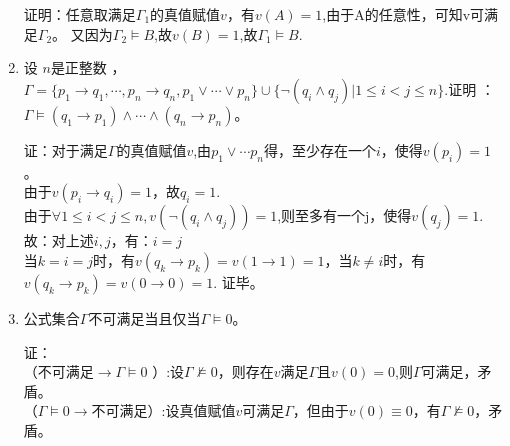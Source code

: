 \documentclass[UTF8]{ctexart}
\begin{document}
\begin{enumerate}
        证明：任意取满足$\Gamma_1$的真值赋值$v$，有$v(A)=1$,由于A的任意性，可知v可满足$\Gamma_2$。
        又因为$\Gamma_2\models B$,故$v(B)=1$,故$\Gamma_1\models B$.

        \item 设 $n$是正整数 ，$\Gamma =\{p_1\rightarrow q_1,\cdots,p_n\rightarrow q_n,p_1\vee \cdots \vee p_n\}\cup \{\neg (q_i\wedge q_j)|1\leq i<j\leq n\}$.证明 ：$\Gamma  \models   (q_1\rightarrow p_1)\wedge \cdots \wedge (q_n\rightarrow p_n)$。
            
        证：对于满足$\Gamma$的真值赋值$v$,由$p_1\vee \cdots p_n$得，至少存在一个$i$，使得$v(p_i)=1$。\\
        由于$v(p_i\rightarrow q_i)=1$，故$q_i=1$.\\
        由于$\forall 1\leq i<j\leq n,v(\neg(q_i\wedge q_j))=1$,则至多有一个j，使得$v(q_j)=1$.\\
        故：对上述$i,j$，有：$i=j$\\
        当$k=i=j$时，有$v(q_k\rightarrow p_k)=v(1\rightarrow 1)=1$，当$k\neq i$时，有$v(q_k \rightarrow p_k)=v(0\rightarrow 0)=1$.
        证毕。

        \item 公式集合$\Gamma $不可满足当且仅当$\Gamma \models  0$。
        
        证：\\
        （不可满足$\rightarrow \Gamma \models 0$ ）:设$\Gamma \nvDash 0$，则存在$v$满足$\Gamma$且$v(0)=0$,则$\Gamma$可满足，矛盾。\\
        （$\Gamma \models 0 \rightarrow $不可满足）:设真值赋值$v$可满足$\Gamma$，但由于$v(0)\equiv 0$，有$\Gamma \nvDash 0$，矛盾。
    \end{enumerate}
\end{document}
